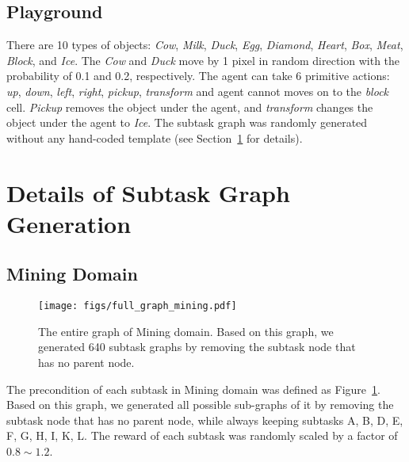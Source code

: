 \documentclass{article} \usepackage{iclr2020_conference,times}
\begin{document}
\subsection{Playground}
There are 10 types of objects: \textit{Cow}, \textit{Milk}, \textit{Duck}, \textit{Egg}, \textit{Diamond}, \textit{Heart}, \textit{Box}, \textit{Meat}, \textit{Block}, and \textit{Ice}. The \textit{Cow} and \textit{Duck} move by 1 pixel in random direction with the probability of 0.1 and 0.2, respectively. The agent can take 6 primitive actions: \textit{up}, \textit{down}, \textit{left}, \textit{right}, \textit{pickup}, \textit{transform} and agent cannot moves on to the \textit{block} cell. \textit{Pickup} removes the object under the agent, and \textit{transform} changes the object under the agent to \textit{Ice}. The subtask graph was randomly generated without any hand-coded template (see Section~\ref{sec:task_graph_gen} for details). 

\section{Details of Subtask Graph Generation} \label{sec:task_graph_gen}
\subsection{Mining Domain}
 \begin{figure}[!htp]\vspace{-6pt}
    \centering
   \texttt{[image: figs/full\_graph\_mining.pdf]}
   \caption{ The entire graph of Mining domain. Based on this graph, we generated 640 subtask graphs by removing the subtask node that has no parent node.}
   \label{fig:full_graph_mining}
\end{figure}
The precondition of each subtask in Mining domain was defined as Figure~\ref{fig:full_graph_mining}. Based on this graph, we generated all possible sub-graphs of it by removing the subtask node that has no parent node, while always keeping subtasks A, B, D, E, F, G, H, I, K, L. The reward of each subtask was randomly scaled by a factor of $0.8\sim 1.2$.
\end{document}

